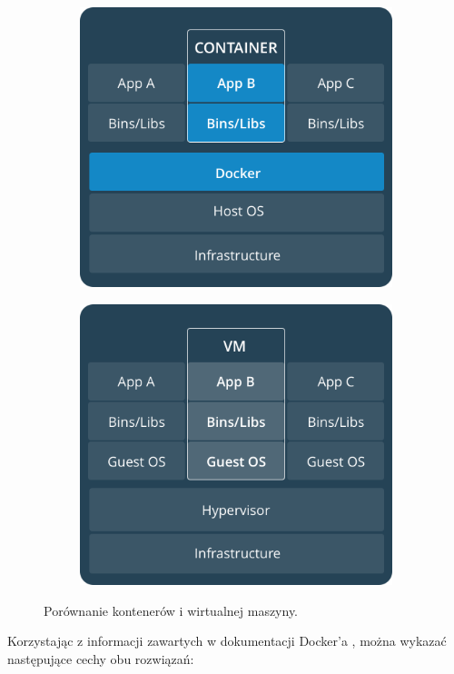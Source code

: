 \documentclass[mgr,oneside]{mgr}
\begin{document}
\begin{figure}[h]
  \centering
  \begin{subfigure}{.5\textwidth}
    \centering
    \includegraphics[width=.6\linewidth]{images/docker_container}
    \label{fig:docker_container}
  \end{subfigure}%
  \begin{subfigure}{.5\textwidth}
    \centering
    \includegraphics[width=.6\linewidth]{images/docker_vm}
    \label{fig:docker_vm}
  \end{subfigure}
  \caption{Porównanie kontenerów i wirtualnej maszyny.}
\end{figure}

Korzystając z informacji zawartych w dokumentacji Docker'a \cite{docker_what_container}, można wykazać następujące cechy obu rozwiązań:
\end{document}
